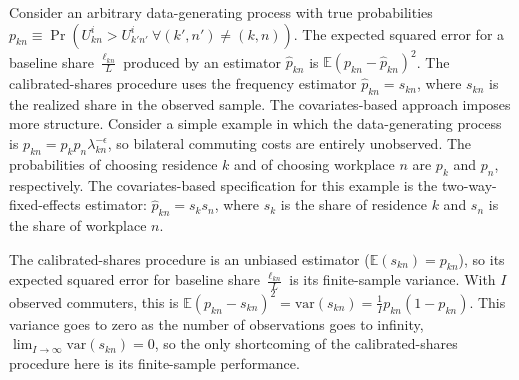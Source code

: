 \documentclass[11pt]{article}
\theoremstyle{definition}
\begin{document}
Consider an arbitrary data-generating process with true probabilities
$p_{kn} \equiv \Pr(U_{kn}^{i} > U_{k'n'}^{i} \ \forall (k',n') \neq (k,n))$.
The expected squared error for a baseline share $\frac{\ell_{kn}}{L}$ produced by an estimator $\hat{p}_{kn}$
is $\mathbb{E}\left(p_{kn} - \hat{p}_{kn}\right)^2$.
The calibrated-shares procedure uses the frequency estimator $\hat{p}_{kn} = s_{kn}$, where $s_{kn}$ is the realized share in the observed sample.
The covariates-based approach imposes more structure.
Consider a simple example in which the data-generating process is 
$p_{kn}
= p_k p_n \lambda^{-\epsilon}_{kn}$,
so bilateral commuting costs are entirely unobserved.
The probabilities of choosing residence $k$ and of choosing workplace $n$ are
$p_k$ and $p_n$, respectively.
The covariates-based specification for this example
is the two-way-fixed-effects estimator:
$\hat{p}_{kn} = s_k s_n$,
where $s_k$ is the share of residence $k$ and $s_n$ is the share of workplace $n$.

The calibrated-shares procedure is an unbiased estimator ($\mathbb{E}(s_{kn}) = p_{kn}$),
so its expected squared error for baseline share $\frac{\ell_{kn}}{L}$ is its finite-sample variance.
With $I$ observed commuters, this is
$
\mathbb{E}\left(p_{kn} - {s}_{kn}\right)^2
=
\text{var}\left(s_{kn}\right)
=
\frac{1}{I} p_{kn}(1-p_{kn})
$.
This variance goes to zero as the number of observations goes to infinity,
$\lim_{I \to \infty}\text{var}\left(s_{kn}\right) = 0$,
so the only shortcoming of the calibrated-shares procedure here is its finite-sample performance.
\end{document}
